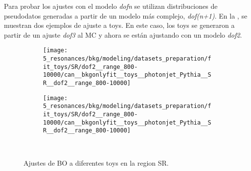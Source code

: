 Para probar los ajustes con el modelo \textit{dofn} se utilizan distribuciones de pseudodatos generadas a partir de un modelo más complejo, \textit{dof(n+1)}. En la \Fig{\ref{fig:bkg:modeling:preparation:toys:bkgonly_examples_toys_fits}}, se muestran dos ejemplos de ajuste a toys. En este caso, los toys se generaron a partir de un ajuste \textit{dof3} al \ac{MC} y ahora se están ajustando con un modelo \textit{dof2}.

\begin{figure}[ht!]
    \centering
    \begin{subfigure}[h]{0.49\linewidth}
        \centering
        \texttt{[image: 5\_resonances/bkg/modeling/datasets\_preparation/fit\_toys/SR/dof2\_\_range\_800-10000/can\_\_bkgonlyfit\_\_toys\_\_photonjet\_Pythia\_\_SR\_\_dof2\_\_range\_800-10000]}
    \end{subfigure}
    \hfill
    \begin{subfigure}[h]{0.49\linewidth}
        \centering
        \texttt{[image: 5\_resonances/bkg/modeling/datasets\_preparation/fit\_toys/SR/dof2\_\_range\_800-10000/can\_\_bkgonlyfit\_\_toys\_\_photonjet\_Pythia\_\_SR\_\_dof2\_\_range\_800-10000]}
    \end{subfigure}\\
    \caption{Ajustes de \ac{BO} a diferentes toys en la region SR.}
    \label{fig:bkg:modeling:preparation:toys:bkgonly_examples_toys_fits}
\end{figure}

